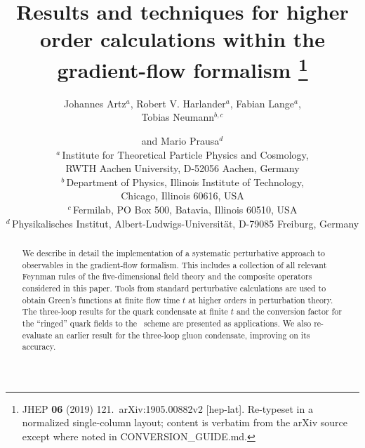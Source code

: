 \documentclass[11pt]{article}
\title{Results and techniques for higher order calculations within the
  gradient-flow formalism%
\thanks{JHEP {\bf 06} (2019) 121.~arXiv:1905.00882v2 [hep-lat].
  Re-typeset in a normalized single-column layout; content is verbatim
  from the arXiv source except where noted in CONVERSION\_GUIDE.md.}}
\author{Johannes Artz$^a$, Robert V. Harlander$^a$, Fabian Lange$^a$,\\
  Tobias Neumann$^{b,c}$ \and and Mario Prausa$^d$\\[0.8em]
\normalsize
$^a$\,Institute for Theoretical Particle Physics and Cosmology,\\
\normalsize RWTH Aachen University, D-52056 Aachen, Germany\\[0.3em]
$^b$\,Department of Physics, Illinois Institute of Technology,\\
\normalsize Chicago, Illinois 60616, USA\\[0.3em]
$^c$\,Fermilab, PO Box 500, Batavia, Illinois 60510, USA\\[0.3em]
$^d$\,Physikalisches Institut, Albert-Ludwigs-Universit\"at,
D-79085 Freiburg, Germany}
\date{}
\begin{document}
\maketitle

\begin{abstract}
  We describe in detail the implementation of a systematic perturbative
  approach to observables in the \qcd{} gradient-flow formalism.  This
  includes a collection of all relevant Feynman rules of the
  five-dimensional field theory and the composite operators considered
  in this paper. Tools from standard perturbative calculations are used
  to obtain Green's functions at finite flow time $t$ at higher orders
  in perturbation theory. The three-loop results for the quark
  condensate at finite $t$ and the conversion factor for the ``ringed''
  quark fields to the \msbar\ scheme are presented as applications. We
  also re-evaluate an earlier result for the three-loop gluon
  condensate, improving on its accuracy.
\end{abstract}

\vspace{1em}
\tableofcontents

\clearpage









\end{document}
